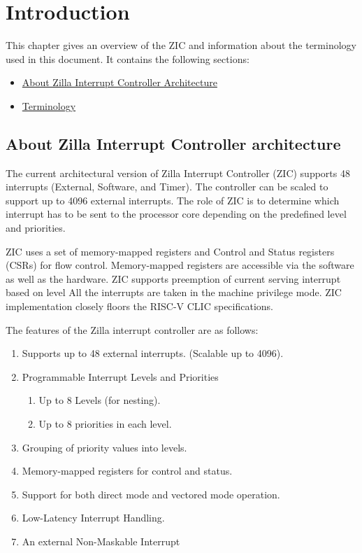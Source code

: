 \chapter{Introduction}
This chapter gives an overview of the ZIC  and information about the terminology used in this document. It contains the following sections:
\begin{itemize}
    \item \hyperref[sec:about-zic-arch]{About Zilla Interrupt Controller Architecture}
    \item \hyperref[sec:terminology]{Terminology}
\end{itemize}
\newpage

\section{About Zilla Interrupt Controller architecture}
\label{sec:about-zic-arch}
The current architectural version of Zilla Interrupt Controller (ZIC) supports 48 interrupts (External, Software, and Timer). The controller can be scaled to support up to 4096 external interrupts. The role of ZIC is to determine which interrupt has to be sent to the processor core depending on the predefined level and priorities.

ZIC uses a set of memory-mapped registers and Control and Status registers (CSRs) for flow control. Memory-mapped registers are accessible via the software as well as the hardware. ZIC supports preemption of current serving interrupt based on level All the interrupts are taken in the machine privilege mode. ZIC implementation closely floors the RISC-V CLIC specifications.

The features of the Zilla interrupt controller are as follows:

\begin{enumerate}
    \item Supports up to 48 external interrupts. (Scalable up to 4096).
    \item Programmable Interrupt Levels and Priorities
    \begin{enumerate}[label=(\alph*)]
        \item Up to 8 Levels (for nesting).
        \item Up to 8 priorities in each level.
    \end{enumerate}
    \item Grouping of priority values into levels.
    \item Memory-mapped registers for control and status.
    \item Support for both direct mode and vectored mode operation.
    \item Low-Latency Interrupt Handling.
    \item An external Non-Maskable Interrupt
\end{enumerate}

